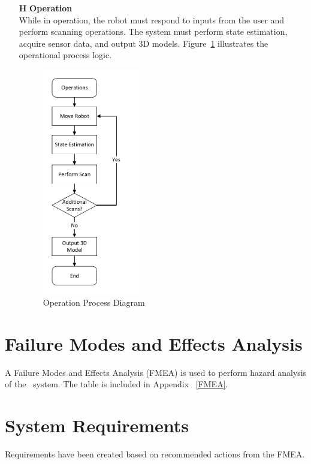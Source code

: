 \documentclass[12pt]{article}
\newcounter{haznum} %
\begin{document}
\begin{itemize}
\item[\textbf{H\refstepcounter{haznum}\thehaznum \label{H2}}] \textbf{Operation}\\
While in operation, the robot must respond to inputs from the user and perform scanning operations. The system must perform state estimation, acquire sensor data, and output 3D models. Figure~\ref{fig_Operation} illustrates the operational process logic.
\begin{figure}[H]
\centering
\includegraphics[width = 0.4\textwidth]{Figures/Operation Processes.pdf}
\caption{Operation Process Diagram}
\label{fig_Operation}
\end{figure}
\end{itemize}

\section{Failure Modes and Effects Analysis}

A Failure Modes and Effects Analysis (FMEA) is used to perform hazard analysis of the \progname ~system. The table is included in Appendix ~\ref{FMEA}.

\section{System Requirements}

Requirements have been created based on recommended actions from the FMEA.
\end{document}
